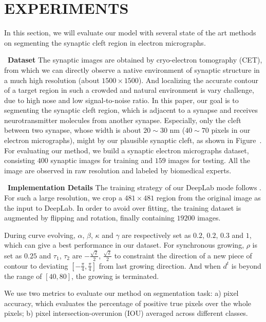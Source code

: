 \section{EXPERIMENTS}
In this section, we will evaluate our model with several state of the art methods on segmenting the synaptic cleft region in electron micrographs.

~\noindent\textbf{Dataset}
The synaptic images are obtained by cryo-electron tomography (CET), from which we can directly observe a native environment of synaptic structure in a much high resolution (about $1500\times 1500$).
And localizing the accurate contour of a target region in such a crowded and natural environment is vary challenge, due to high nose and low signal-to-noise ratio.
In this paper, our goal is to segmenting the synaptic cleft region, which is adjacent to a synapse and receives neurotransmitter molecules from another synapse.
Especially, only the cleft between two synapse, whose width is about $20\sim30$ nm ($40\sim70$ pixels in our electron micrographs), might by our plausible synaptic cleft, as shown in Figure~.
For evaluating our method, we build a synaptic electron micrographs dataset, consisting $400$ synaptic images for training and $159$ images for testing.
All the image are observed in raw resolution and labeled by biomedical experts.

~\noindent\textbf{Implementation Details}
The training strategy of our DeepLab mode follows \cite{Chen2016a}.
For such a large resolution, we crop a $481\times 481$ region \cite{Chen2016} from the original image as the input to DeepLab.
In order to avoid over fitting, the training dataset is augmented by flipping and rotation, finally containing $19200$ images.

During curve evolving, $\alpha$, $\beta$, $\kappa$ and $\gamma$ are respectively set as $0.2$, $0.2$, $0.3$ and $1$, which can give a best performance in our dataset.
For synchronous growing, $\rho$ is set as $0.25$ and $\tau_1$, $\tau_2$ are $-\frac{\sqrt{2}}{2}$, $\frac{\sqrt{2}}{2}$ to constraint the direction of a new piece of contour to deviating $[-\frac{\pi}{4},\frac{\pi}{4}]$ from last growing direction.
And when $d^{t}$ is beyond the range of $[40,80]$, the growing is terminated.

We use two metrics \cite{Cheng2017} to evaluate our method on segmentation task:
a) pixel accuracy, which evaluates the percentage of positive true pixels over the whole pixels;
b) pixel intersection-overunion (IOU) averaged across different classes.

